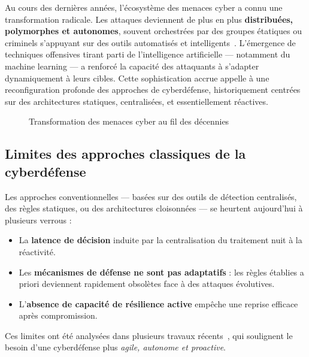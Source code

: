 \documentclass[ twoside,openright,titlepage,numbers=noenddot,headinclude,%
                footinclude=true,cleardoublepage=empty,abstractoff, %
                BCOR=5mm,paper=a4,fontsize=11pt,%
                french,american,%
                ]{scrreprt}
\begin{document}
Au cours des dernières années, l'écosystème des menaces cyber a connu une transformation radicale. Les attaques deviennent de plus en plus \textbf{distribuées, polymorphes et autonomes}, souvent orchestrées par des groupes étatiques ou criminels s'appuyant sur des outils automatisés et intelligents~\cite{Tarraf2021}. L'émergence de techniques offensives tirant parti de l'intelligence artificielle — notamment du machine learning — a renforcé la capacité des attaquants à s'adapter dynamiquement à leurs cibles. Cette sophistication accrue appelle à une reconfiguration profonde des approches de cyberdéfense, historiquement centrées sur des architectures statiques, centralisées, et essentiellement réactives.

\begin{figure}[h]
    \centering
    \caption{Transformation des menaces cyber au fil des décennies}
    \label{fig:evolution_menaces}
\end{figure}

\subsection*{Limites des approches classiques de la cyberdéfense}

Les approches conventionnelles — basées sur des outils de détection centralisés, des règles statiques, ou des architectures cloisonnées — se heurtent aujourd'hui à plusieurs verrous :

\begin{itemize}
    \item La \textbf{latence de décision} induite par la centralisation du traitement nuit à la réactivité.
    \item Les \textbf{mécanismes de défense ne sont pas adaptatifs} : les règles établies a priori deviennent rapidement obsolètes face à des attaques évolutives.
    \item L'\textbf{absence de capacité de résilience active} empêche une reprise efficace après compromission.
\end{itemize}

Ces limites ont été analysées dans plusieurs travaux récents~\cite{MITRECyberResilience2020, GCSCC2021}, qui soulignent le besoin d'une cyberdéfense plus \emph{agile, autonome et proactive}.
\end{document}

